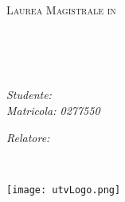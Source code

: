 \documentclass[
12pt,           %
oneside,       %
italian,
liststotoc,    %
toctotoc,      %
]{MastersDoctoralThesis} %
\author{Andrea Di Iorio} %
\begin{document}
\begin{titlepage}
	\begin{center}
	\vspace*{.06\textheight}
	{\scshape\LARGE \univname\par}\vspace{1.5cm} %
	\textsc{\Large Laurea Magistrale in \\ \degreename}\\[0.5cm] %
	
	\HRule \\[0.4cm] %
	{\huge \bfseries \ttitle\par}\vspace{0.4cm} %
	\HRule \\[1.5cm] %
	 
	\begin{minipage}[t]{0.4\textwidth}
	\begin{flushleft} \large
	\emph{Studente:  \authorname\\Matricola: 0277550}\\
	\end{flushleft}
	
	\end{minipage}
	\begin{minipage}[t]{0.4\textwidth}
	\begin{flushright} \large
	\emph{Relatore: \supname}\\
	\end{flushright}
	\end{minipage}\\[3cm]
	 
	\vfill
	
	\vfill
	
	\texttt{[image: utvLogo.png]}
	\vfill
	\end{center}
\end{titlepage}
\end{document}
